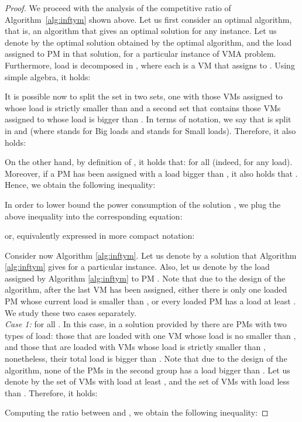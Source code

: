\begin{proof}
We proceed with the analysis of the competitive ratio of Algorithm~\ref{alg:inftym} shown above.
Let us first consider an optimal algorithm, that is, an algorithm that gives an optimal solution for any instance.
Let us denote by  the optimal solution obtained by the optimal algorithm, and  the load assigned to PM  in that solution, for a particular instance of VMA problem.
Furthermore, load  is decomposed in , where each  is a VM that  assigns to .
Using simple algebra, it holds:

It is possible now to split the set  in two sets, one with those VMs assigned to  whose load is strictly smaller than  and a second set that contains those VMs assigned to  whose load is bigger than .
In terms of notation, we say that  is split in  and  (where  stands for Big loads and  stands for Small loads).
Therefore, it also holds:


On the other hand, by definition of , it holds that:  for all  (indeed, for any load).
Moreover, if a PM has been assigned with a load  bigger than , it also holds that .
Hence, we obtain the following inequality:


In order to lower bound the power consumption of the solution , we plug the above inequality into the corresponding equation:

or, equivalently expressed in more compact notation:


Consider now Algorithm  \ref{alg:inftym}. Let us denote by  a solution that Algorithm  \ref{alg:inftym} gives for a particular instance.
Also, let us denote by  the load assigned by Algorithm \ref{alg:inftym} to PM .
 Note that due to the design of the algorithm,
after the last VM has been assigned, either there is only one loaded PM whose current load is smaller than ,
or every loaded PM has a load at least . We study these two cases separately.  \\
\emph{Case 1:}  for all .
In this case, in a solution provided by  there are PMs with two types of load:
those that are loaded with one VM whose load is no smaller than ,
and those that are loaded with VMs whose load is strictly smaller than , nonetheless, their total load is bigger than .
Note that due to the design of the algorithm, none of the PMs in the second group has a load bigger than .
Let us denote by  the set of VMs with load at least ,
and  the set of VMs with load less than .
Therefore, it holds:

{Computing the ratio  between  and , we obtain the following inequality:

}
\end{proof}
